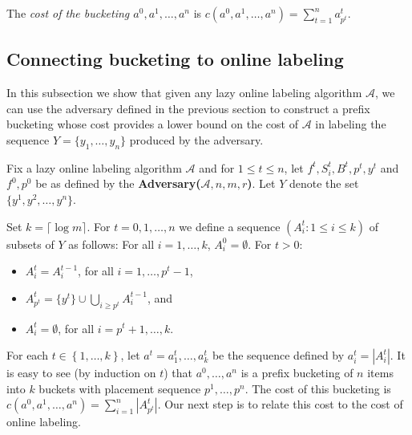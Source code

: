 \documentclass[11pt]{article}
\newcommand{\A}{\mathcal{A}}
\newcommand{\natInt}[2]{ \left\{ #1, \dotsc, #2 \right\} }
\begin{document}
\iffalse
satisfying: $a^0 = (0,0,\dotsc,0)$ and for $t=1,2,\dotsc,n$, there exists $p^{t} \in \natInt{1}{k}$ such that
\begin{enumerate}
\item $a^t_i = a^{t-1}_i$, for all $i=1,2,\dotsc,p^{t}-1$,
\item $a^t_{p^{t}} = 1+ \sum_{i\ge p^{t}} a^{t-1}_i$, and
\item $a^t_i = 0$, for all $i=p^{t}+1,\dotsc,k$.
\end{enumerate}
\fi

The \emph{cost of the bucketing $a^0,a^1,\dotsc,a^n$} is $c(a^0,a^1,\dotsc,a^n) = \sum_{t=1}^n a^t_{p^{t}}$. 

\subsection{Connecting bucketing to online labeling}
\label{ss-b to ol}

In this subsection we show that given any lazy online labeling algorithm $\A$, we can use the adversary
defined in the previous section to construct a prefix bucketing whose cost provides a lower bound
on the cost of $\A$ in labeling the sequence $Y=\{y_1,\ldots,y_n\}$ produced by the adversary. 


Fix a lazy online labeling algorithm $\A$ and for $1 \leq t \leq n$, let $f^t,S^t_i,B^t,p^{t},y^t$ and $f^0,p^0$ be as
defined by the {\bf Adversary($\A,n,m,r$)}. Let $Y$ denote the set $\{y^1,y^2,\dotsc,y^n\}$.


Set $k=\lceil \log m\rceil$.
For $t=0,1,\dotsc,n$ we define a sequence $(A^t_i:1 \leq i \leq k)$ of subsets of $Y$
as follows:
For all $i=1,\dotsc,k$, $A^0_i = \emptyset$.  For $t>0$:
\begin{itemize}
\item $A^t_i = A^{t-1}_i$, for all $i=1,\dotsc,p^{t}-1$,
\item $A^t_{p^{t}} = \{y^t\} \cup \bigcup_{i\ge p^{t}} A^{t-1}_i$, and
\item $A^t_i = \emptyset$, for all $i=p^{t}+1,\dotsc, k$.
\end{itemize}

For each $t \in \natInt{1}{k}$, let $a^t=a^t_1,\ldots,a^t_k$ be the sequence defined
by $a^t_i=|A^t_i|$.  It is easy to see (by induction on $t$) that $a^0,\ldots,a^n$ is a prefix bucketing
of $n$ items into $k$ buckets with placement sequence $p^1,\ldots,p^n$. 
The cost of this bucketing is $c(a^0,a^1,\dots,a^n)=\sum_{i=1}^n |A^t_{p^t}|$.  Our next step is to relate this cost
to the cost of online labeling.
\end{document}
